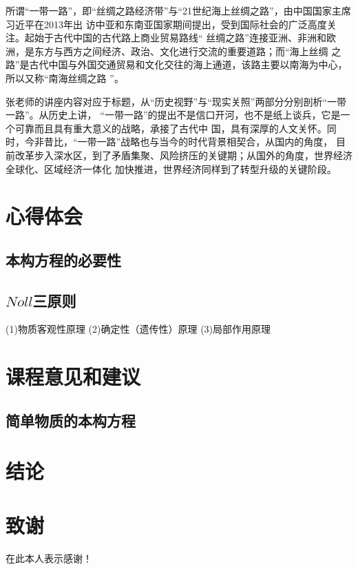 \documentclass[a4paper]{cctart}
\numberwithin{equation}{section} \pagestyle{fancy}
\begin{document}
所谓“一带一路”，即“丝绸之路经济带”与“21世纪海上丝绸之路”，由中国国家主席习近平在2013年出
访中亚和东南亚国家期间提出，受到国际社会的广泛高度关注。起始于古代中国的古代路上商业贸易路线“
丝绸之路”连接亚洲、非洲和欧洲，是东方与西方之间经济、政治、文化进行交流的重要道路；而“海上丝绸
之路”是古代中国与外国交通贸易和文化交往的海上通道，该路主要以南海为中心，所以又称“南海丝绸之路
”。

张老师的讲座内容对应于标题，从“历史视野”与“现实关照”两部分分别剖析“一带一路”。从历史上讲，
“一带一路”的提出不是信口开河，也不是纸上谈兵，它是一个可靠而且具有重大意义的战略，承接了古代中
国，具有深厚的人文关怀。同时，今非昔比，“一带一路”战略也与当今的时代背景相契合，从国内的角度，
目前改革步入深水区，到了矛盾集聚、风险挤压的关键期；从国外的角度，世界经济全球化、区域经济一体化
加快推进，世界经济同样到了转型升级的关键阶段。

\DeclareRobustCommand\CTeX{$\mathbb{C}$\kern-.05em\TeX{}}

\section{心得体会}\label{2}
\subsection{本构方程的必要性}


\subsection{$Noll$三原则}

(1){\kaishu 物质客观性原理}
(2){\kaishu 确定性（遗传性）原理}
(3){\kaishu 局部作用原理}


\section{课程意见和建议}\label{3}



\subsection{简单物质的本构方程}


\section{结论}

\section{致谢}
在此本人表示感谢！
\end{document}
